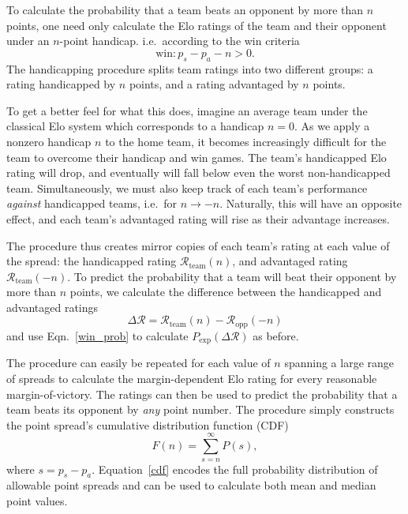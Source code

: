 \documentclass[aps,prc,reprint,amsmath,superscriptaddress,nofootinbib]{revtex4-1}
\newcommand{\R}{\mathcal{R}}
\begin{document}
To calculate the probability that a team beats an opponent by more than $n$ points, one need only calculate the Elo ratings of the team and their opponent under an $n$-point handicap. i.e.\ according to the win criteria
\begin{equation}
  \text{win}: p_s - p_a - n > 0.
\end{equation}
The handicapping procedure splits team ratings into two different groups: a rating handicapped by $n$ points, and a rating advantaged by $n$ points.

To get a better feel for what this does, imagine an average team under the classical Elo system which corresponds to a handicap $n=0$. 
As we apply a nonzero handicap $n$ to the home team, it becomes increasingly difficult for the team to overcome their handicap and win games.
The team's handicapped Elo rating will drop, and eventually will fall below even the worst non-handicapped team.
Simultaneously, we must also keep track of each team's performance \emph{against} handicapped teams, i.e.\ for $n \rightarrow -n$.
Naturally, this will have an opposite effect, and each team's advantaged rating will rise as their advantage increases.

The procedure thus creates mirror copies of each team's rating at each value of the spread: the handicapped rating $\R_\text{team}(n)$, and advantaged rating $\R_\text{team}(-n)$.
To predict the probability that a team will beat their opponent by more than $n$ points, we calculate the difference between the handicapped and advantaged ratings
\begin{equation}
  \label{rtg_diff}
  \Delta\R = \R_\text{team}(n) - \R_\text{opp}(-n)
\end{equation}
and use Eqn.~\eqref{win_prob} to calculate $P_\text{exp}(\Delta \R)$ as before.

The procedure can easily be repeated for each value of $n$ spanning a large range of spreads to calculate the margin-dependent Elo rating for every reasonable margin-of-victory.
The ratings can then be used to predict the probability that a team beats its opponent by \emph{any} point number.
The procedure simply constructs the point spread's cumulative distribution function (CDF)
\begin{equation}
  \label{cdf}
  F(n) = \sum_{s=n}^\infty P(s),
\end{equation}
where $s = p_s - p_a$.
Equation~\eqref{cdf} encodes the full probability distribution of allowable point spreads and can be used to calculate both mean and median point values.
\end{document}
